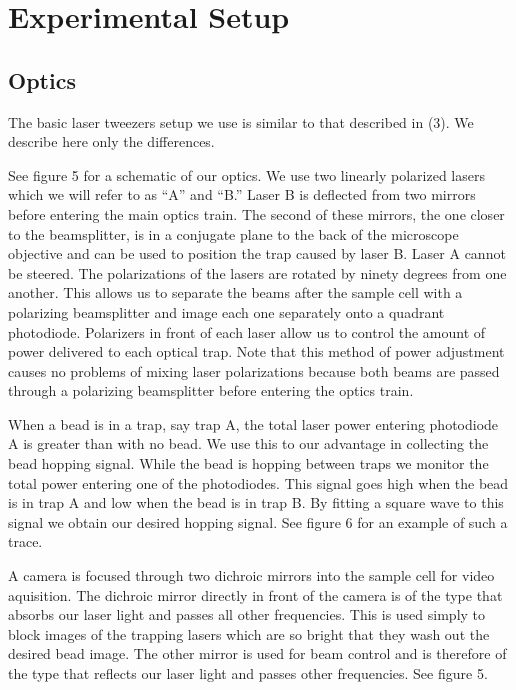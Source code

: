 \documentclass{report}
\begin{document}

\chapter{Experimental Setup}

\section{Optics}

The basic laser tweezers setup we use is similar to that described in (3). We describe here only the differences.

See figure 5 for a schematic of our optics. We use two linearly polarized lasers which we will refer to as ``A'' and ``B.'' Laser B is deflected from two mirrors before entering the main optics train. The second of these mirrors, the one closer to the beamsplitter, is in a conjugate plane to the back of the microscope objective and can be used to position the trap caused by laser B. Laser A cannot be steered. The polarizations of the lasers are rotated by ninety degrees from one another. This allows us to separate the beams after the sample cell with a polarizing beamsplitter and image each one separately onto a quadrant photodiode. Polarizers in front of each laser allow us to control the amount of power delivered to each optical trap. Note that this method of power adjustment causes no problems of mixing laser polarizations because both beams are passed through a polarizing beamsplitter before entering the optics train.

When a bead is in a trap, say trap A, the total laser power entering photodiode A is greater than with no bead. We use this to our advantage in collecting the bead hopping signal. While the bead is hopping between traps we monitor the total power entering one of the photodiodes. This signal goes high when the bead is in trap A and low when the bead is in trap B. By fitting a square wave to this signal we obtain our desired hopping signal. See figure 6 for an example of such a trace.

A camera is focused through two dichroic mirrors into the sample cell for video aquisition. The dichroic mirror directly in front of the camera is of the type that absorbs our laser light and passes all other frequencies. This is used simply to block images of the trapping lasers which are so bright that they wash out the desired bead image. The other mirror is used for beam control and is therefore of the type that reflects our laser light and passes other frequencies. See figure 5.
\end{document}
